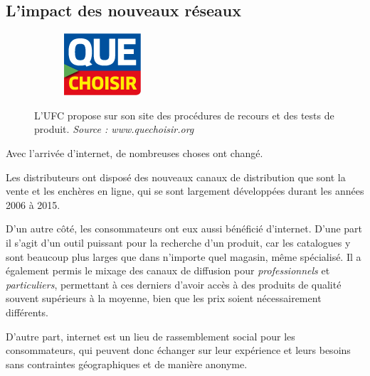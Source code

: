 \subsection{L'impact des nouveaux réseaux}

\begin{figure}
~~~~~~\includegraphics[scale=1]{Rsc/logo-quechoisir.png} 
\caption{L'UFC propose sur son site des procédures de recours et des tests de produit. \textit{Source : www.quechoisir.org}}
\label{UFC}
\end{figure} 

Avec l'arrivée d'internet, de nombreuses choses ont changé.

\medbreak
Les distributeurs ont disposé des nouveaux canaux de distribution que sont la vente et les enchères en ligne, qui se sont largement développées durant les années 2006 à 2015.

\bigbreak
D'un autre côté, les consommateurs ont eux aussi bénéficié d'internet.\smallbreak
D'une part il s'agit d'un outil puissant pour la recherche d'un produit, car les catalogues y sont beaucoup plus larges que dans n'importe quel magasin, même spécialisé. Il a également permis le mixage des canaux de diffusion pour \textit{professionnels} et \textit{particuliers}, permettant à ces derniers d'avoir accès à des produits de qualité souvent supérieurs à la moyenne, bien que les prix soient nécessairement différents.

D'autre part, internet est un lieu de rassemblement social pour les consommateurs, qui peuvent donc échanger sur leur expérience et leurs besoins sans contraintes géographiques et de manière anonyme.
